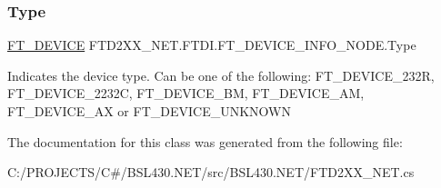 \subsubsection{\texorpdfstring{Type}{Type}}
{\footnotesize\ttfamily \mbox{\hyperlink{class_f_t_d2_x_x___n_e_t_1_1_f_t_d_i_a7f69db13362f65d251d6b16e3eec585f}{F\+T\+\_\+\+D\+E\+V\+I\+CE}} F\+T\+D2\+X\+X\+\_\+\+N\+E\+T.\+F\+T\+D\+I.\+F\+T\+\_\+\+D\+E\+V\+I\+C\+E\+\_\+\+I\+N\+F\+O\+\_\+\+N\+O\+D\+E.\+Type}



Indicates the device type. Can be one of the following\+: F\+T\+\_\+\+D\+E\+V\+I\+C\+E\+\_\+232R, F\+T\+\_\+\+D\+E\+V\+I\+C\+E\+\_\+2232C, F\+T\+\_\+\+D\+E\+V\+I\+C\+E\+\_\+\+BM, F\+T\+\_\+\+D\+E\+V\+I\+C\+E\+\_\+\+AM, F\+T\+\_\+\+D\+E\+V\+I\+C\+E\+\_\+AX or F\+T\+\_\+\+D\+E\+V\+I\+C\+E\+\_\+\+U\+N\+K\+N\+O\+WN 



The documentation for this class was generated from the following file\+:\begin{DoxyCompactItemize}
\item 
C\+:/\+P\+R\+O\+J\+E\+C\+T\+S/\+C\#/\+B\+S\+L430.\+N\+E\+T/src/\+B\+S\+L430.\+N\+E\+T/F\+T\+D2\+X\+X\+\_\+\+N\+E\+T.\+cs\end{DoxyCompactItemize}
